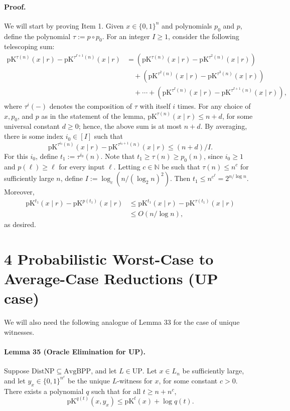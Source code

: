 \documentclass[10pt,a4paper]{article}
\begin{document}
\paragraph{Proof.} We will start by proving Item 1. Given $x\in\{0,1\}^n$ and polynomials $p_0$ and $p$, define the polynomial $\tau:=p\circ p_0$. For an integer $I\geq1$, consider the following telescoping sum:
\begin{align*}
\mathrm{pK}^{\tau(n)}(x\mid r)-\mathrm{pK}^{\tau^{I+1}(n)}(x\mid r)
&=(\mathrm{pK}^{\tau(n)}(x\mid r)-\mathrm{pK}^{\tau^2(n)}(x\mid r))\\
&\quad+(\mathrm{pK}^{\tau^2(n)}(x\mid r)-\mathrm{pK}^{\tau^3(n)}(x\mid r))\\
&\quad+\cdots+(\mathrm{pK}^{\tau^I(n)}(x\mid r)-\mathrm{pK}^{\tau^{I+1}(n)}(x\mid r)),
\end{align*}
where $\tau^i(-)$ denotes the composition of $\tau$ with itself $i$ times. For any choice of $x,p_0$, and $p$ as in the statement of the lemma, $\mathrm{pK}^{\tau(n)}(x\mid r)\leq n+d$, for some universal constant $d\geq0$; hence, the above sum is at most $n+d$. By averaging, there is some index $i_0\in[I]$ such that
\[\mathrm{pK}^{\tau^{i_0}(n)}(x\mid r)-\mathrm{pK}^{\tau^{i_0+1}(n)}(x\mid r)\leq(n+d)/I.\]
For this $i_0$, define $t_1:=\tau^{i_0}(n)$. Note that $t_1\geq\tau(n)\geq p_0(n)$, since $i_0\geq1$ and $p(\ell)\geq\ell$ for every input $\ell$. Letting $c\in\mathbb N$ be such that $\tau(n)\leq n^c$ for sufficiently large $n$, define $I:=\log_c(n/(\log_2n)^2)$. Then $t_1\leq n^{c^I}=2^{n/\log n}$. Moreover,
\begin{align*}
\mathrm{pK}^{t_1}(x\mid r)-\mathrm{pK}^{p(t_1)}(x\mid r)&\leq\mathrm{pK}^{t_1}(x\mid r)-\mathrm{pK}^{\tau(t_1)}(x\mid r)\\
&\leq O(n/\log n),
\end{align*}
as desired.

\section*{4 Probabilistic Worst-Case to Average-Case Reductions (UP case)}
We will also need the following analogue of Lemma 33 for the case of unique witnesses.
\paragraph{Lemma 35 (Oracle Elimination for UP).} Suppose $\mathrm{DistNP}\subseteq\mathrm{AvgBPP}$, and let $L\in\mathrm{UP}$. Let $x\in L_n$ be sufficiently large, and let $y_x\in\{0,1\}^{n^c}$ be the unique $L$-witness for $x$, for some constant $c>0$. There exists a polynomial $q$ such that for all $t\geq n+n^c$,
\[\mathrm{pK}^{q(t)}(x,y_x)\leq\mathrm{pK}^t(x)+\log q(t).\]
\end{document}
